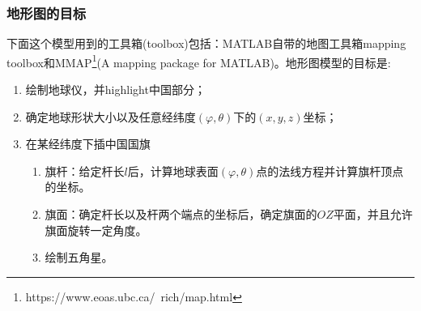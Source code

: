         \subsubsection{地形图的目标}
            \par
            下面这个模型用到的工具箱(toolbox)包括：MATLAB自带的地图工具箱mapping toolbox和MMAP\footnote{https://www.eoas.ubc.ca/~rich/map.html}(A mapping package for MATLAB)。地形图模型的目标是:
            \begin{enumerate}
              \item 绘制地球仪，并highlight中国部分；
              \item 确定地球形状大小以及任意经纬度$(\varphi,\theta)$下的$(x,y,z)$坐标；
              \item 在某经纬度下插中国国旗
                \begin{enumerate}
                  \item 旗杆：给定杆长$l$后，计算地球表面$(\varphi,\theta)$点的法线方程并计算旗杆顶点的坐标。
                  \item 旗面：确定杆长以及杆两个端点的坐标后，确定旗面的$OZ$平面，并且允许旗面旋转一定角度。
                  \item 绘制五角星。
                \end{enumerate}
            \end{enumerate}
